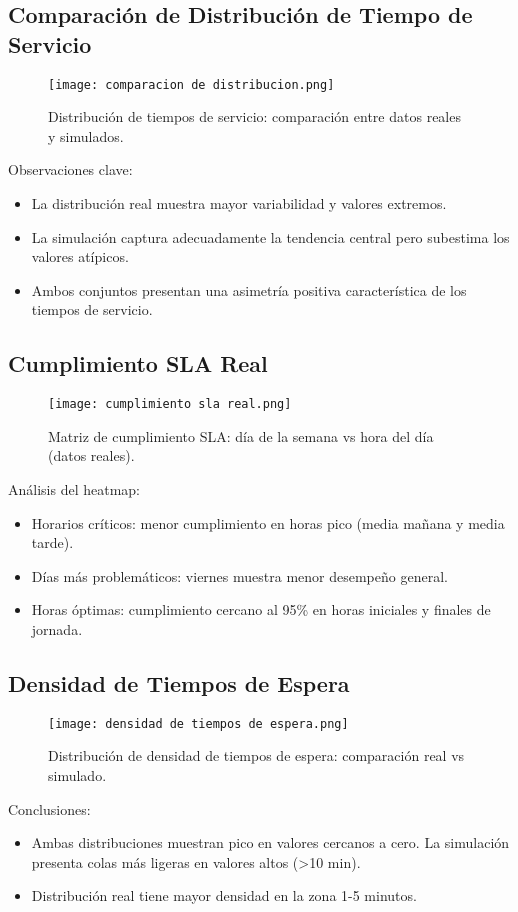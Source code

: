 \documentclass[12pt]{article}
\begin{document}
\subsection{Comparación de Distribución de Tiempo de Servicio}
\begin{figure}[H]
  \centering
  \texttt{[image: comparacion de distribucion.png]}
  \caption{Distribución de tiempos de servicio: comparación entre datos reales y simulados.}
\end{figure}
\noindent
Observaciones clave:
\begin{itemize}
  \item La distribución real muestra mayor variabilidad y valores extremos.
  \item La simulación captura adecuadamente la tendencia central pero subestima los valores atípicos.
  \item Ambos conjuntos presentan una asimetría positiva característica de los tiempos de servicio.
\end{itemize}

\subsection{Cumplimiento SLA Real}
\begin{figure}[H]
  \centering
  \texttt{[image: cumplimiento sla real.png]}
  \caption{Matriz de cumplimiento SLA: día de la semana vs hora del día (datos reales).}
\end{figure}
\noindent
Análisis del heatmap:
\begin{itemize}
  \item Horarios críticos: menor cumplimiento en horas pico (media mañana y media tarde).
  \item Días más problemáticos: viernes muestra menor desempeño general.
  \item Horas óptimas: cumplimiento cercano al 95\% en horas iniciales y finales de jornada.
\end{itemize}

\subsection{Densidad de Tiempos de Espera}
\begin{figure}[H]
  \centering
  \texttt{[image: densidad de tiempos de espera.png]}
  \caption{Distribución de densidad de tiempos de espera: comparación real vs simulado.}
\end{figure}
\noindent
Conclusiones:
\begin{itemize}
  \item Ambas distribuciones muestran pico en valores cercanos a cero.
  \tail La simulación presenta colas más ligeras en valores altos (>10 min).
  \item Distribución real tiene mayor densidad en la zona 1-5 minutos.
\end{itemize}
\end{document}
